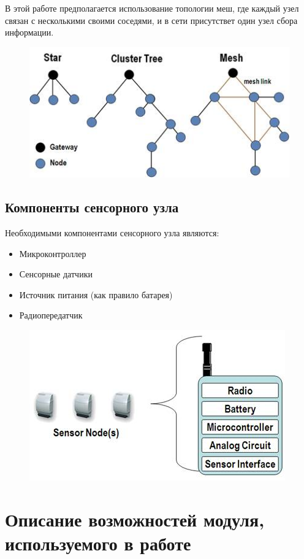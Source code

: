 \documentclass[bibliography=totocnumbered]{scrartcl}
\begin{document}
В этой работе предполагается использование топологии меш, где каждый узел связан с несколькими своими соседями, и в сети присутствет один узел сбора информации.

\begin{figure}[htp]
\centering
\includegraphics[scale=1.00]{topology.jpg}
\end{figure}

\subsection{Компоненты сенсорного узла}

Необходимыми компонентами сенсорного узла являются:
\begin{itemize}
	\item Микроконтроллер
	\item Сенсорные датчики
	\item Источник питания (как правило батарея)
	\item Радиопередатчик
\end{itemize}

\begin{figure}[htp]
\centering
\includegraphics[scale=1.00]{components.jpg}
\end{figure}



\section{Описание возможностей модуля, используемого в работе}
\end{document}
